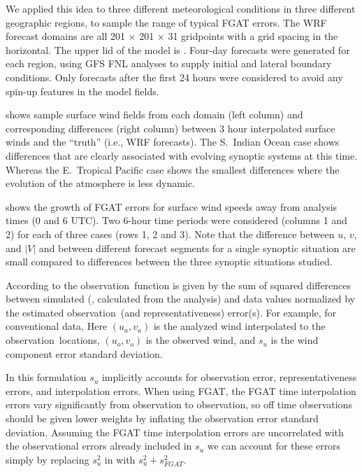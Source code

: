 \documentclass[12pt,titlepage]{article}
\begin{document}
We applied this idea to three different meteorological conditions
in three different geographic regions, to sample the range of
typical FGAT errors.
 The WRF forecast domains are all 201 $\times$ 201 $\times$ 31
gridpoints with a  grid spacing in the horizontal.
 The upper lid of the model is .
 Four-day forecasts were generated for each region, using GFS FNL
analyses to supply initial and lateral boundary conditions.
 Only forecasts after the first 24 hours were considered to avoid
any spin-up features in the model fields.

  shows sample surface wind fields from
each domain (left column) and corresponding differences (right
column) between 3 hour interpolated surface winds and the
``truth'' (i.e., WRF forecasts).
 The S.~Indian Ocean case shows differences that are clearly
associated with evolving synoptic systems at this time.
 Whereas the E.~Tropical Pacific case shows the smallest
differences where the evolution of the atmosphere is less dynamic.

  shows the growth of FGAT errors for
surface wind speeds away from analysis times (0 and 6 UTC).
 Two 6-hour time periods were considered (columns 1 and 2) for
each of three cases (rows 1, 2 and 3).
 Note that the difference between $u$, $v$, and $|V|$ and between
different forecast segments for a single synoptic situation are small
compared to differences between the three synoptic situations studied.


  \renewcommand{\vardef}[3]{$ {#1} $ is the {#2}}
  \newcommand{\Obs}{Observation}
  \newcommand{\obs}{observation}

According to \cite{HofLH+03} the \obs\ function is given by the sum of
squared differences between simulated (\ie, calculated from the
analysis) and data values normalized by the estimated \obs\ (and
representativeness) error(s).
 For example, for conventional data,
 Here
 \vardef{(u_a, v_a)}{analyzed wind interpolated to the \obs\
locations,}{m s^{-1}}
 \vardef{(u_o, v_o)}{observed wind, and}{m s^{-1}}
 \vardef{s_u}{wind component error standard deviation.}{m s^{-1}}

In this formulation $s_u$ implicitly accounts for observation error,
representativeness errors, and interpolation errors.
When using FGAT, the FGAT time interpolation errors vary significantly
from observation to observation, so off time observations should be
given lower weights by inflating the observation error standard
deviation.
Assuming the FGAT time interpolation errors are uncorrelated with the
observational errors already included in $s_u$ we can account for
these errors simply by replacing $s_u^2$ in \eqr{Jconv} with $s_u^2 +
s_{FGAT}^2$. 
\end{document}
